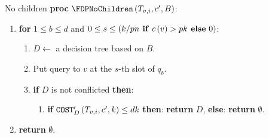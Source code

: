 \begin{frame}{No children}
    \textbf{proc} $\FDPNoChildren\br{T_{v,i},c',B}$:
    \begin{enumerate}
        \item \textbf{for} $1\leq b\leq d$ and $0\leq s\leq \left( k/pn \text{\textbf{ if} }c\left( v \right)>pk \text{\textbf{ else} 0} \right)$:
        \begin{enumerate}
            \item $D\gets$ a decision tree based on $B$.
            \item Put query to $v$ at the $s$-th slot of $q_b$.
            \item \textbf{if} $D$ is not conflicted \textbf{then}:
            \begin{enumerate}
                \item \textbf{if} $\texttt{COST}'_{D}\left( T_{v,i},c',k \right)\leq dk$ \textbf{then}: \textbf{return} $D$, \textbf{else}: \textbf{return} $\emptyset$.
            \end{enumerate}
        \end{enumerate}
        \item \textbf{return} $\emptyset$.
    \end{enumerate}
\end{frame}
